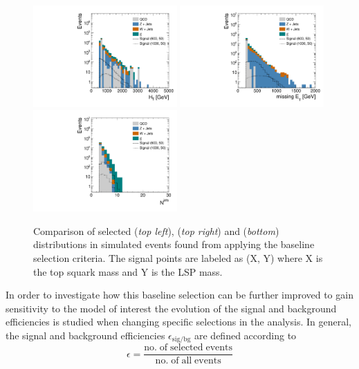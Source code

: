 \begin{figure}[!t]
  \centering
  \begin{minipage}[c]{1.\textwidth}
    \begin{center}
      \includegraphics[width=0.49\textwidth]{figures/Stop_DeltaPhiSelection_HThad.pdf}  
      \includegraphics[width=0.49\textwidth]{figures/Stop_DeltaPhiSelection_MET.pdf} \\
      \includegraphics[width=0.49\textwidth]{figures/Stop_DeltaPhiSelection_N_jets.pdf}
    \end{center}
  \end{minipage}

  \caption{Comparison of selected \HT (\textit{top left}), \met (\textit{top right}) and \NJets (\textit{bottom}) distributions in simulated events found from applying the baseline selection criteria. The signal points are labeled as (X, Y) where X is the top squark mass and Y is the LSP mass.}
  \label{fig:stop_baseline}
\end{figure}
In order to investigate how this baseline selection can be further improved to gain sensitivity to the model of interest the evolution of the signal and background efficiencies is studied when changing specific selections in the analysis. In general, the signal and background efficiencies $\epsilon_\mathrm{sig/bg}$ are defined according to
\begin{equation}
\epsilon = \frac{\mathrm{no. \; of \; selected \; events}}{\mathrm{no. \; of \; all \; events}}
\end{equation} 

